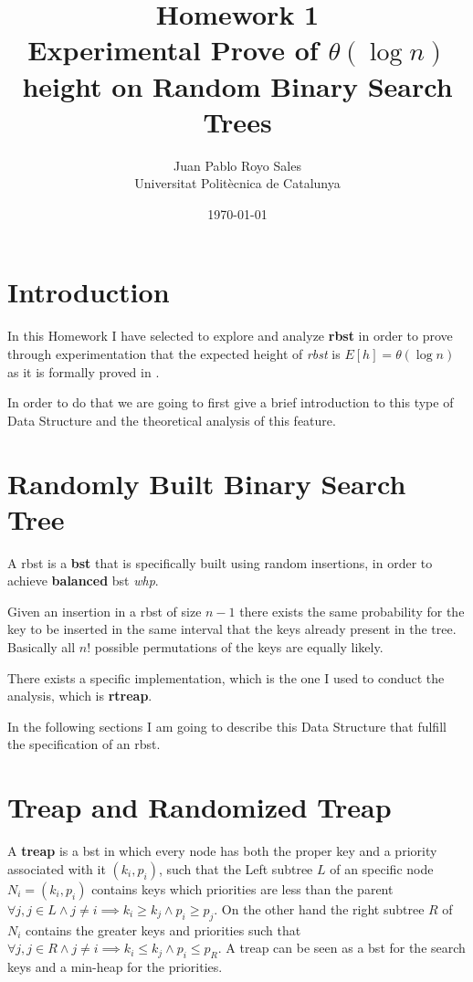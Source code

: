 \documentclass[12pt, a4paper]{article}
\title{%
      Homework 1 \\
      Experimental Prove of $\theta(\log n)$ height on Random Binary Search Trees
}
\author{%
  Juan Pablo Royo Sales \\
  \small{Universitat Politècnica de Catalunya}
}
\date\today
\begin{document}
\maketitle

\section{Introduction}
In this Homework I have selected to explore and analyze \textbf{\acrfull{rbst}} in order to prove through experimentation that the expected height of \textit{\acrshort{rbst}} is $E[h] = \theta(\log n)$ as it is formally proved in \cite{cormen}.

In order to do that we are going to first give a brief introduction to this type of Data Structure and the theoretical analysis of this feature.

\section{Randomly Built Binary Search Tree}
A \acrshort{rbst} is a \textbf{\acrfull{bst}} that is specifically built using random insertions, in order to achieve \textbf{balanced} \acrshort{bst} \textit{whp}.

Given an insertion in a \acrshort{rbst} of size $n - 1$ there exists the same probability for the key to be inserted in the same interval that the keys already present in the tree. Basically all $n{!}$ possible permutations of the keys are equally likely.

There exists a specific implementation, which is the one I used to conduct the analysis, which is \textbf{\acrfull{rtreap}}.

In the following sections I am going to describe this Data Structure that fulfill the specification of an \acrshort{rbst}.

\section{Treap and Randomized Treap}
A \textbf{\acrfull{treap}} is a \acrshort{bst} in which every node has both the proper key and a priority associated with it $(k_i, p_i)$, such that the Left subtree $L$ of an specific node $N_i = (k_i, p_i)$ contains keys which priorities are less than the parent $\forall j, j \in L \land j \neq i \implies k_i \geq k_j \land p_i \geq p_j$. On the other hand the right subtree $R$ of $N_i$ contains the greater keys and priorities such that $\forall j, j \in R \land j \neq i \implies k_i \leq k_j \land p_i \leq p_R$. A \acrshort{treap} can be seen as a \acrshort{bst} for the search keys and a min-heap for the priorities.
\end{document}
